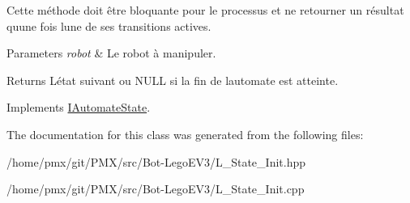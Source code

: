 Cette méthode doit être bloquante pour le processus et ne retourner un résultat qu\textquotesingle{}une fois l\textquotesingle{}une de ses transitions actives.


\begin{DoxyParams}{Parameters}
{\em robot} & Le robot à manipuler. \\
\hline
\end{DoxyParams}
\begin{DoxyReturn}{Returns}
L\textquotesingle{}état suivant ou {\ttfamily N\+U\+LL} si la fin de l\textquotesingle{}automate est atteinte. 
\end{DoxyReturn}


Implements \hyperlink{classIAutomateState_a58bf3c2c5b55f7ba3fc1783fc36e102b}{I\+Automate\+State}.



The documentation for this class was generated from the following files\+:\begin{DoxyCompactItemize}
\item 
/home/pmx/git/\+P\+M\+X/src/\+Bot-\/\+Lego\+E\+V3/L\+\_\+\+State\+\_\+\+Init.\+hpp\item 
/home/pmx/git/\+P\+M\+X/src/\+Bot-\/\+Lego\+E\+V3/L\+\_\+\+State\+\_\+\+Init.\+cpp\end{DoxyCompactItemize}
